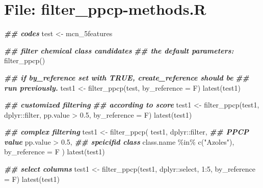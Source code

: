 \documentclass[
]{article}
\newenvironment{Shaded}{\begin{snugshade}}{\end{snugshade}}
\newcommand{\AttributeTok}[1]{\textcolor[rgb]{0.77,0.63,0.00}{#1}}
\newcommand{\DecValTok}[1]{\textcolor[rgb]{0.00,0.00,0.81}{#1}}
\newcommand{\DocumentationTok}[1]{\textcolor[rgb]{0.56,0.35,0.01}{\textbf{\textit{#1}}}}
\newcommand{\FloatTok}[1]{\textcolor[rgb]{0.00,0.00,0.81}{#1}}
\newcommand{\FunctionTok}[1]{\textcolor[rgb]{0.00,0.00,0.00}{#1}}
\newcommand{\NormalTok}[1]{#1}
\newcommand{\OtherTok}[1]{\textcolor[rgb]{0.56,0.35,0.01}{#1}}
\newcommand{\SpecialCharTok}[1]{\textcolor[rgb]{0.00,0.00,0.00}{#1}}
\newcommand{\StringTok}[1]{\textcolor[rgb]{0.31,0.60,0.02}{#1}}
\begin{document}
\hypertarget{file-filter_ppcp-methods.r}{%
\section{File: filter\_ppcp-methods.R}\label{file-filter_ppcp-methods.r}}

\begin{Shaded}
\begin{Highlighting}[]
\DocumentationTok{\#\# codes}
\NormalTok{test }\OtherTok{\textless{}{-}}\NormalTok{ mcn\_5features}

\DocumentationTok{\#\# filter chemical class candidates}
\DocumentationTok{\#\# the default parameters:}
\FunctionTok{filter\_ppcp}\NormalTok{()}

\DocumentationTok{\#\# if \textquotesingle{}by\_reference\textquotesingle{} set with TRUE, \textquotesingle{}create\_reference\textquotesingle{} should be}
\DocumentationTok{\#\# run previously.}
\NormalTok{test1 }\OtherTok{\textless{}{-}} \FunctionTok{filter\_ppcp}\NormalTok{(test, }\AttributeTok{by\_reference =}\NormalTok{ F)}
\FunctionTok{latest}\NormalTok{(test1)}

\DocumentationTok{\#\# customized filtering}
\DocumentationTok{\#\# according to score}
\NormalTok{test1 }\OtherTok{\textless{}{-}} \FunctionTok{filter\_ppcp}\NormalTok{(test1, dplyr}\SpecialCharTok{::}\NormalTok{filter, pp.value }\SpecialCharTok{\textgreater{}} \FloatTok{0.5}\NormalTok{,}
                     \AttributeTok{by\_reference =}\NormalTok{ F)}
\FunctionTok{latest}\NormalTok{(test1)}

\DocumentationTok{\#\# complex filtering}
\NormalTok{test1 }\OtherTok{\textless{}{-}} \FunctionTok{filter\_ppcp}\NormalTok{(}
\NormalTok{  test1, dplyr}\SpecialCharTok{::}\NormalTok{filter,}
  \DocumentationTok{\#\# PPCP value}
\NormalTok{  pp.value }\SpecialCharTok{\textgreater{}} \FloatTok{0.5}\NormalTok{,}
  \DocumentationTok{\#\# speicifid class}
\NormalTok{  class.name }\SpecialCharTok{\%in\%} \FunctionTok{c}\NormalTok{(}\StringTok{"Azoles"}\NormalTok{),}
  \AttributeTok{by\_reference =}\NormalTok{ F}
\NormalTok{)}
\FunctionTok{latest}\NormalTok{(test1)}

\DocumentationTok{\#\# select columns}
\NormalTok{test1 }\OtherTok{\textless{}{-}} \FunctionTok{filter\_ppcp}\NormalTok{(test1, dplyr}\SpecialCharTok{::}\NormalTok{select, }\DecValTok{1}\SpecialCharTok{:}\DecValTok{5}\NormalTok{,}
                     \AttributeTok{by\_reference =}\NormalTok{ F)}
\FunctionTok{latest}\NormalTok{(test1)}
\end{Highlighting}
\end{Shaded}
\end{document}
